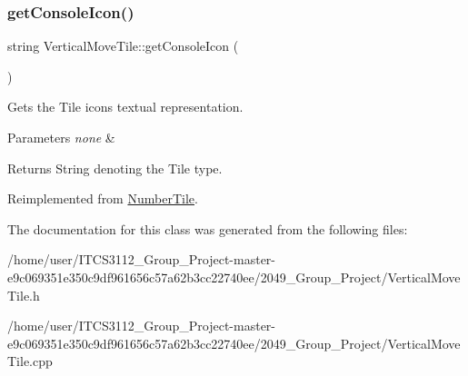 \mbox{\label{classVerticalMoveTile_a0f313f3ba4d1cef0f91f7accd38a93ed}} 
\subsubsection{\texorpdfstring{get\+Console\+Icon()}{getConsoleIcon()}}
{\footnotesize\ttfamily string Vertical\+Move\+Tile\+::get\+Console\+Icon (\begin{DoxyParamCaption}{ }\end{DoxyParamCaption})\hspace{0.3cm}{\ttfamily [virtual]}}

Gets the Tile icons textual representation.


\begin{DoxyParams}{Parameters}
{\em none} & \\
\hline
\end{DoxyParams}
\begin{DoxyReturn}{Returns}
String denoting the Tile type. 
\end{DoxyReturn}


Reimplemented from \hyperlink{classNumberTile_a33a9dad43334d12c5b3842f1a45b1b66}{Number\+Tile}.



The documentation for this class was generated from the following files\+:\begin{DoxyCompactItemize}
\item 
/home/user/\+I\+T\+C\+S3112\+\_\+\+Group\+\_\+\+Project-\/master-\/e9c069351e350c9df961656c57a62b3cc22740ee/2049\+\_\+\+Group\+\_\+\+Project/Vertical\+Move\+Tile.\+h\item 
/home/user/\+I\+T\+C\+S3112\+\_\+\+Group\+\_\+\+Project-\/master-\/e9c069351e350c9df961656c57a62b3cc22740ee/2049\+\_\+\+Group\+\_\+\+Project/Vertical\+Move\+Tile.\+cpp\end{DoxyCompactItemize}
